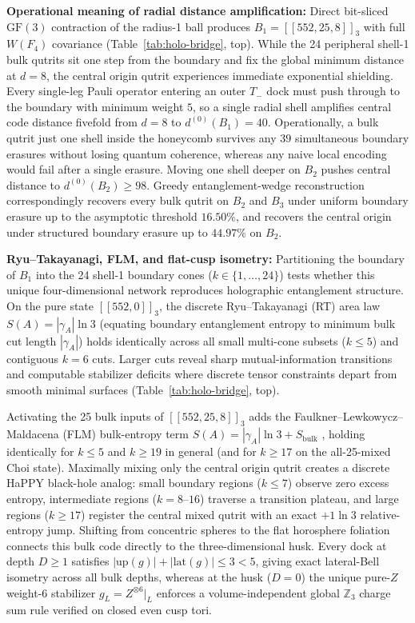 \textbf{Operational meaning of radial distance amplification:} Direct bit-sliced $\mathrm{GF}(3)$ contraction of the
radius-1 ball produces $B_1 = [[552, 25, 8]]_3$ with full $W(F_4)$ covariance (Table~\ref{tab:holo-bridge}, top). While
the 24 peripheral shell-1 bulk qutrits sit one step from the boundary and fix the global minimum distance at $d = 8$, the
central origin qutrit experiences immediate exponential shielding. Every single-leg Pauli operator entering an outer
$T_-$ dock must push through to the boundary with minimum weight $5$, so a single radial shell amplifies central code
distance fivefold from $d = 8$ to $d^{(0)}(B_1) = 40$. Operationally, a bulk qutrit just one shell inside the honeycomb
survives any $39$ simultaneous boundary erasures without losing quantum coherence, whereas any naive local encoding
would fail after a single erasure. Moving one shell deeper on $B_2$ pushes central distance to $d^{(0)}(B_2) \ge 98$.
Greedy entanglement-wedge reconstruction correspondingly recovers every bulk qutrit on $B_2$ and $B_3$ under uniform
boundary erasure up to the asymptotic threshold $16.50\%$, and recovers the central origin under structured boundary
erasure up to $44.97\%$ on $B_2$.

\textbf{Ryu--Takayanagi, FLM, and flat-cusp isometry:} Partitioning the boundary of $B_1$ into the 24 shell-1 boundary
cones ($k \in \{1, \dots, 24\}$) tests whether this unique four-dimensional network reproduces holographic entanglement
structure. On the pure state $[[552, 0]]_3$, the discrete Ryu--Takayanagi (RT) area law $S(A) = |\gamma_A|\ln 3$
\cite{ryu2006rt} (equating boundary entanglement entropy to minimum bulk cut length $|\gamma_A|$) holds identically across
all small multi-cone subsets ($k \le 5$) and contiguous $k = 6$ cuts. Larger cuts reveal sharp mutual-information
transitions and computable stabilizer deficits where discrete tensor constraints depart from smooth minimal surfaces
(Table~\ref{tab:holo-bridge}, top).

Activating the 25 bulk inputs of $[[552, 25, 8]]_3$ adds the Faulkner--Lewkowycz--Maldacena (FLM) bulk-entropy term
$S(A) = |\gamma_A|\ln 3 + S_{\mathrm{bulk}}$ \cite{faulkner2013flm}, holding identically for $k \le 5$ and $k \ge 19$ in
general (and for $k \ge 17$ on the all-25-mixed Choi state). Maximally mixing only the central origin qutrit creates a
discrete HaPPY black-hole analog: small boundary regions ($k \le 7$) observe zero excess entropy, intermediate regions
($k = 8\text{--}16$) traverse a transition plateau, and large regions ($k \ge 17$) register the central mixed qutrit with
an exact $+1\ln 3$ relative-entropy jump. Shifting from concentric spheres to the flat horosphere foliation connects this
bulk code directly to the three-dimensional husk. Every dock at depth $D \ge 1$ satisfies
$|\mathrm{up}(g)| + |\mathrm{lat}(g)| \le 3 < 5$, giving exact lateral-Bell isometry across all bulk depths, whereas at
the husk ($D = 0$) the unique pure-$Z$ weight-6 stabilizer $g_L = Z^{\otimes 6}|_L$ enforces a volume-independent global
$\mathbb{Z}_3$ charge sum rule verified on closed even cusp tori.

